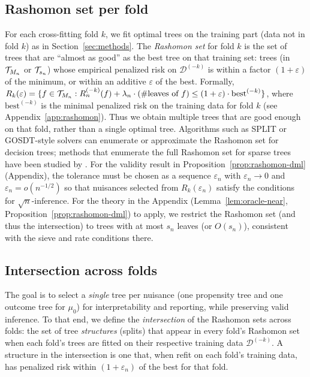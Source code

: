 \documentclass[12pt]{article}
\begin{document}
\subsection{Rashomon set per fold}

For each cross-fitting fold $k$, we fit optimal trees on the training part (data not in fold $k$) as in Section~\ref{sec:methods}. The \emph{Rashomon set} for fold $k$ is the set of trees that are ``almost as good'' as the best tree on that training set: trees (in $\mathcal{T}_{M_n}$ or $\mathcal{T}_{s_n}$) whose empirical penalized risk on $\mathcal{D}^{(-k)}$ is within a factor $(1+\varepsilon)$ of the minimum, or within an additive $\varepsilon$ of the best. Formally, $R_k(\varepsilon) = \{ f \in \mathcal{T}_{M_n} : R_n^{(-k)}(f) + \lambda_n \cdot (\#\text{leaves of } f) \le (1+\varepsilon) \cdot \text{best}^{(-k)} \}$, where $\text{best}^{(-k)}$ is the minimal penalized risk on the training data for fold $k$ (see Appendix~\ref{app:rashomon}). Thus we obtain multiple trees that are good enough on that fold, rather than a single optimal tree. Algorithms such as SPLIT \citep{babbarNearOptimalDecisionTrees2025} or GOSDT-style solvers can enumerate or approximate the Rashomon set for decision trees; methods that enumerate the full Rashomon set for sparse trees have been studied by \citet{xinExploringWholeRashomon2022}. For the validity result in Proposition~\ref{prop:rashomon-dml} (Appendix), the tolerance must be chosen as a sequence $\varepsilon_n$ with $\varepsilon_n \to 0$ and $\varepsilon_n = o(n^{-1/2})$ so that nuisances selected from $R_k(\varepsilon_n)$ satisfy the conditions for $\sqrt{n}$-inference. For the theory in the Appendix (Lemma~\ref{lem:oracle-near}, Proposition~\ref{prop:rashomon-dml}) to apply, we restrict the Rashomon set (and thus the intersection) to trees with at most $s_n$ leaves (or $O(s_n)$), consistent with the sieve and rate conditions there.

\subsection{Intersection across folds}

The goal is to select a \emph{single} tree per nuisance (one propensity tree and one outcome tree for $\mu_0$) for interpretability and reporting, while preserving valid inference. To that end, we define the \emph{intersection} of the Rashomon sets across folds: the set of tree \emph{structures} (splits) that appear in every fold's Rashomon set when each fold's trees are fitted on their respective training data $\mathcal{D}^{(-k)}$. A structure in the intersection is one that, when refit on each fold's training data, has penalized risk within $(1+\varepsilon_n)$ of the best for that fold.
\end{document}
